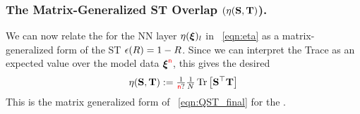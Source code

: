 \subsubsection{The Matrix-Generalized ST Overlap 
\texorpdfstring{$(\eta({\mathbf{S}},{\mathbf{T}})$)}{ETA(S, T)}.}
We can now relate the \SelfOverlap for the NN layer $\eta(\boldsymbol{\xi})_{l}$ in \EQN~\ref{eqn:eta}
as a matrix-generalized form of the ST \EffectivePotential $\epsilon(R)=1-R$.
Since we can interpret the Trace as an expected value over the model data $\boldsymbol{\xi}^{{\color{red}\sf{n}}}$, this gives the desired
\begin{align}
  \label{eqn:eta_mat_avg_def}
  \eta({\mathbf{S}},{\mathbf{T}})
  :=\tfrac{1}{{\color{red}\sf{n}} ?}\tfrac{1}{N} \mbox{}\operatorname{Tr}\left[{\mathbf{S}}^{\top}{\mathbf{T}}\right] 
\end{align}
This is the matrix generalized form of \EQN~\ref{eqn:QST_final} for the \LayerQuality.
